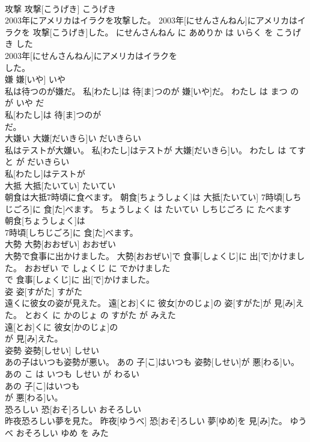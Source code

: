 \documentclass[8pt]{extreport}
\begin{document}
\begin{CJK}{UTF8}{min}
\\	攻撃	攻撃[こうげき]	こうげき	
\\	2003年にアメリカはイラクを攻撃した。	2003年[にせんさんねん]にアメリカはイラクを 攻撃[こうげき]した。	にせんさんねん に あめりか は いらく を こうげき した	
\\	2003年[にせんさんねん]にアメリカはイラクを
\\	した。			
\\	嫌	嫌[いや]	いや	
\\	私は待つのが嫌だ。	私[わたし]は 待[ま]つのが 嫌[いや]だ。	わたし は まつ の が いや だ	
\\	私[わたし]は 待[ま]つのが
\\	だ。			
\\	大嫌い	大嫌[だいきら]い	だいきらい	
\\	私はテストが大嫌い。	私[わたし]はテストが 大嫌[だいきら]い。	わたし は てすと が だいきらい	
\\	私[わたし]はテストが
\\	大抵	大抵[たいてい]	たいてい	
\\	朝食は大抵7時頃に食べます。	朝食[ちょうしょく]は 大抵[たいてい] 7時頃[しちじごろ]に 食[た]べます。	ちょうしょく は たいてい しちじごろ に たべます	
\\	朝食[ちょうしょく]は
\\	7時頃[しちじごろ]に 食[た]べます。			
\\	大勢	大勢[おおぜい]	おおぜい	
\\	大勢で食事に出かけました。	大勢[おおぜい]で 食事[しょくじ]に 出[で]かけました。	おおぜい で しょくじ に でかけました	
\\	で 食事[しょくじ]に 出[で]かけました。			
\\	姿	姿[すがた]	すがた	
\\	遠くに彼女の姿が見えた。	遠[とお]くに 彼女[かのじょ]の 姿[すがた]が 見[み]えた。	とおく に かのじょ の すがた が みえた	
\\	遠[とお]くに 彼女[かのじょ]の
\\	が 見[み]えた。			
\\	姿勢	姿勢[しせい]	しせい	
\\	あの子はいつも姿勢が悪い。	あの 子[こ]はいつも 姿勢[しせい]が 悪[わる]い。	あの こ は いつも しせい が わるい	
\\	あの 子[こ]はいつも
\\	が 悪[わる]い。			
\\	恐ろしい	恐[おそ]ろしい	おそろしい	
\\	昨夜恐ろしい夢を見た。	昨夜[ゆうべ] 恐[おそ]ろしい 夢[ゆめ]を 見[み]た。	ゆうべ おそろしい ゆめ を みた	

\end{CJK}
\end{document}
